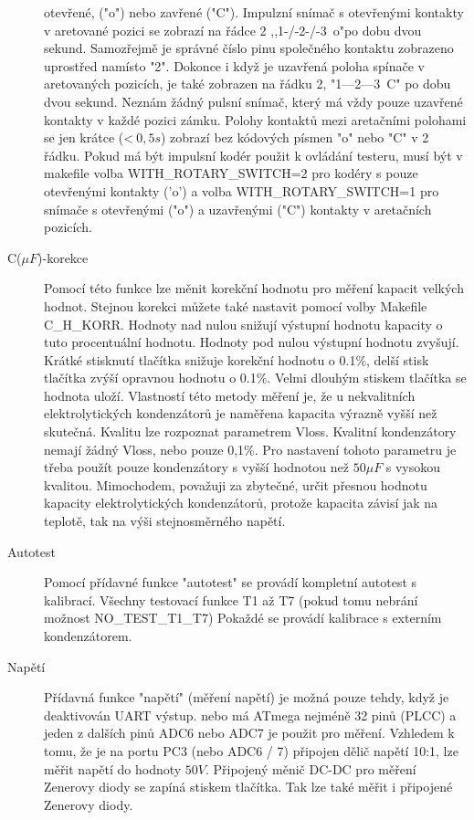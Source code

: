 \begin{description}
otevřené, ("o") nebo zavřené ("C").
Impulzní snímač s otevřenými kontakty v aretované pozici se zobrazí na řádce 2 ,,1-/-2-/-3~o"po
dobu dvou sekund.
Samozřejmě je správné číslo pinu společného kontaktu zobrazeno uprostřed namísto "2".
Dokonce i když je uzavřená poloha spínače v aretovaných pozicích,
je také zobrazen na řádku 2, "1---2---3~C" po dobu dvou sekund.
Neznám žádný pulsní snímač, který má vždy pouze uzavřené kontakty v každé pozici zámku.
Polohy kontaktů mezi aretačními polohami se jen krátce (\textless\(~0,5s\))  zobrazí bez
kódových písmen "o" nebo "C" v 2 řádku.
Pokud má být impulsní kodér použit k ovládání testeru, musí být v makefile  volba
WITH\_ROTARY\_SWITCH=2 pro kodéry s pouze otevřenými kontakty ('o') a volba WITH\_ROTARY\_SWITCH=1 
pro snímače s otevřenými ("o") a uzavřenými ("C") kontakty v aretačních pozicích.
\item[C(\(\mu F\))-korekce]
Pomocí této funkce lze měnit korekční hodnotu pro měření kapacit velkých hodnot.
Stejnou korekci můžete také nastavit pomocí volby Makefile C\_H\_KORR.
Hodnoty nad nulou snižují výstupní hodnotu kapacity o tuto procentuální hodnotu.
Hodnoty pod nulou výstupní hodnotu zvyšují.
Krátké stisknutí tlačítka snižuje korekční hodnotu o 0.1\%,
delší stisk tlačítka zvýší opravnou hodnotu o 0.1\%.
Velmi dlouhým stiskem tlačítka se hodnota uloží.
Vlastností této metody měření je, že u nekvalitních elektrolytických kondenzátorů je
naměřena kapacita výrazně vyšší než skutečná.
Kvalitu lze rozpoznat parametrem Vloss. Kvalitní kondenzátory nemají žádný Vloss, nebo pouze 0,1\%.
Pro nastavení tohoto parametru je třeba použít pouze kondenzátory s vyšší hodnotou
než \(50\mu F\) s vysokou kvalitou.
Mimochodem, považuji za zbytečné, určit přesnou hodnotu kapacity elektrolytických kondenzátorů,
protože kapacita závisí jak na teplotě, tak na výši stejnosměrného napětí.
 \item[Autotest]
Pomocí přídavné funkce "autotest" se provádí kompletní autotest s kalibrací.
Všechny testovací funkce T1 až T7 (pokud tomu nebrání možnost NO\_TEST\_T1\_T7)
Pokaždé se provádí kalibrace s externím kondenzátorem.
 \item[Napětí]
Přídavná funkce "napětí" (měření napětí) je možná pouze tehdy, když je deaktivován UART výstup.
nebo má ATmega nejméně 32 pinů (PLCC) a jeden z dalších pinů  ADC6 nebo ADC7 je použit pro měření.
Vzhledem k tomu, že je na portu PC3 (nebo ADC6 / 7) připojen dělič napětí 10:1,
lze měřit napětí do hodnoty \(50V\).
Připojený měnič DC-DC pro měření Zenerovy diody se zapíná stiskem tlačítka.
Tak lze také měřit i připojené Zenerovy diody.

\end{description}
